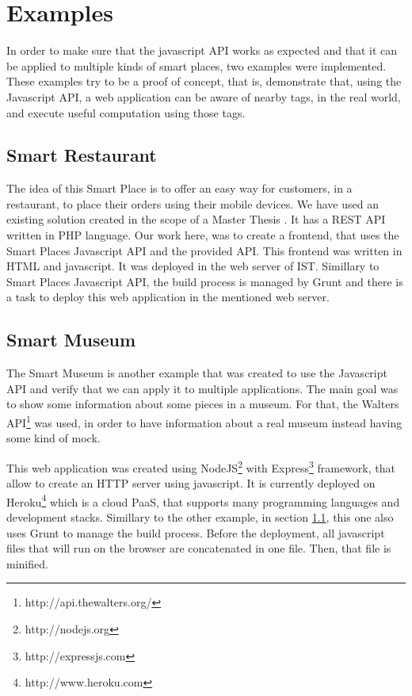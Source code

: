 \section{Examples}
\label{sec:implementation_examples}
In order to make sure that the javascript API works as expected and that it can be applied to multiple kinds of smart places, two examples were implemented.
These examples try to be a proof of concept, that is, demonstrate that, using the Javascript API, a web application can be aware of nearby tags, in the real world, and execute useful computation using those tags.

\subsection{Smart Restaurant}
\label{sub:implementation_smart_restaurant}
The idea of this Smart Place is to offer an easy way for customers, in a restaurant, to place their orders using their mobile devices.
We have used an existing solution created in the scope of a Master Thesis \cite{SLOC}.
It has a \gls{REST} \gls{API} written in \gls{PHP} language.
Our work here, was to create a frontend, that uses the Smart Places Javascript \gls{API} and the provided \gls{API}.
This frontend was written in \gls{HTML} and javascript.
It was deployed in the web server of \gls{IST}. Simillary to Smart Places Javascript \gls{API}, the build process is managed by Grunt and there is a task to deploy this web application in the mentioned web server.

\subsection{Smart Museum}
\label{sub:implementation_smart_museum}
The Smart Museum is another example that was created to use the Javascript API and verify that we can apply it to multiple applications.
The main goal was to show some information about some pieces in a museum. For that, the Walters \gls{API}\footnote{http://api.thewalters.org/} was used, in order to have information about a real museum instead having some kind of mock.

This web application was created using NodeJS\footnote{http://nodejs.org} with Express\footnote{http://expressjs.com} framework, that allow to create an \gls{HTTP} server using javascript.
It is currently deployed on Heroku\footnote{http://www.heroku.com} which is a cloud \gls{PaaS}, that supports many programming languages and development stacks.
Simillary to the other example, in section \ref{sub:implementation_smart_restaurant}, this one also uses Grunt to manage the build process. Before the deployment, all javascript files that will run on the browser are concatenated in one file. Then, that file is minified.
